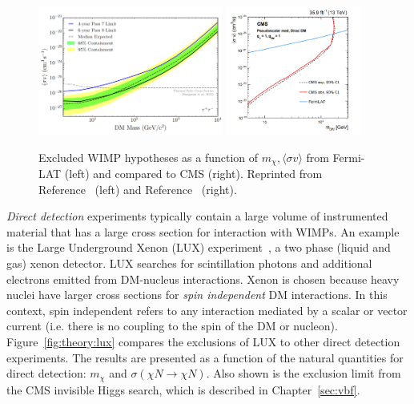 \begin{figure}[]
\begin{center}
    \includegraphics[width=0.54\textwidth]{figures/theory/fermilat.png}
    \includegraphics[width=0.4\textwidth]{figures/theory/monojet.png}
    \caption{Excluded WIMP hypotheses as a function of $m_\chi,\langle\sigma v\rangle$ from Fermi-LAT (left) and compared to CMS (right).
             Reprinted from Reference~\cite{fermilat} (left) and Reference~\cite{monojet} (right).}
    \label{fig:theory:fermilat}
\end{center}
\end{figure}

\emph{Direct detection} experiments typically contain a large volume of instrumented material that has a large cross section for interaction with WIMPs.
An example is the Large Underground Xenon (LUX) experiment~\cite{lux}, a two phase (liquid and gas) xenon detector.
LUX searches for scintillation photons and additional electrons emitted from DM-nucleus interactions.
Xenon is chosen because heavy nuclei have larger cross sections for \emph{spin independent} DM interactions.
In this context, spin independent refers to any interaction mediated by a scalar or vector current (i.e. there is no coupling to the spin of the DM or nucleon). 
Figure~\ref{fig:theory:lux} compares the exclusions of LUX to other direct detection experiments.
The results are presented as a function of the natural quantities for direct detection: $m_\chi$ and $\sigma(\chi N \rightarrow \chi N)$.
Also shown is the exclusion limit from the CMS invisible Higgs search, which is described in Chapter~\ref{sec:vbf}.

